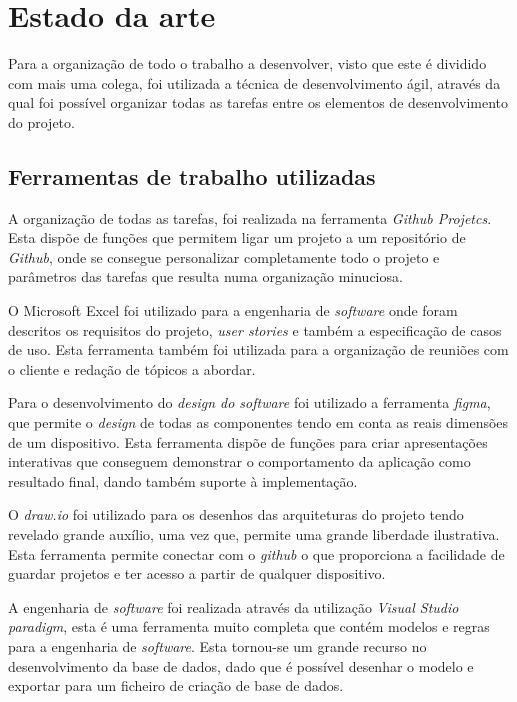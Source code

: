
\chapter{Estado da arte}
Para a organização de todo o trabalho a desenvolver, visto que este é dividido com mais uma colega, foi utilizada a técnica de desenvolvimento ágil, através da qual foi possível organizar todas as tarefas entre os elementos de desenvolvimento do projeto.

\section{Ferramentas de trabalho utilizadas}

A organização de todas as tarefas, foi realizada na ferramenta \textit{Github Projetcs}. Esta dispõe de funções que permitem ligar um projeto a um repositório de \textit{Github}, onde se consegue personalizar completamente todo o projeto e parâmetros das tarefas que resulta numa organização minuciosa.

O Microsoft Excel foi utilizado para a engenharia de \textit{software} onde foram descritos os requisitos do projeto, \textit{user stories} e também a especificação de casos de uso. Esta ferramenta também foi utilizada para a organização de reuniões com o cliente e redação de tópicos a abordar.

Para o desenvolvimento do \textit{design do software} foi utilizado a ferramenta \textit{figma}, que permite o \textit{design} de todas as componentes tendo em conta as reais dimensões de um dispositivo. Esta ferramenta dispõe de funções para criar apresentações interativas que conseguem demonstrar o comportamento da aplicação como resultado final, dando também suporte à implementação.

O \textit{draw.io} foi utilizado para os desenhos das arquiteturas do projeto tendo revelado grande auxílio, uma vez que, permite uma grande liberdade ilustrativa. Esta ferramenta permite conectar com o \textit{github} o que proporciona a facilidade de guardar projetos e ter acesso a partir de qualquer dispositivo.

A engenharia de \textit{software} foi realizada através da utilização \textit{Visual Studio paradigm}, esta é uma ferramenta muito completa que contém modelos e regras para a engenharia de \textit{software}. Esta tornou-se um grande recurso no desenvolvimento da base de dados, dado que é possível desenhar o modelo e exportar para um ficheiro de criação de base de dados.


